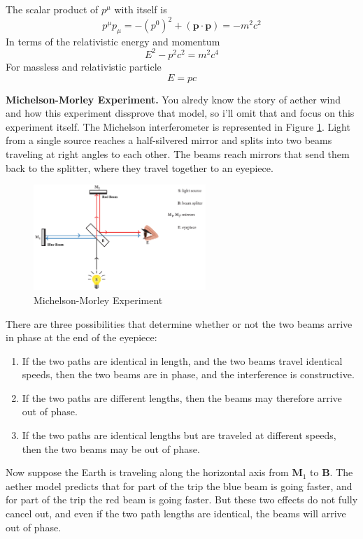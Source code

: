 \documentclass[../main.tex]{subfiles}
\begin{document}
The scalar product of $p^\mu$ with itself is
\begin{equation*}
    p^\mu p_\mu=-(p^0)^2+(\mathbf{p}\cdot\mathbf{p})=-m^2c^2
\end{equation*}
In terms of the relativistic energy and momentum
\begin{equation*}
    E^2-p^2c^2=m^2c^4
\end{equation*}
For massless and relativistic particle
\begin{equation*}
    E=pc
\end{equation*}

\textbf{Michelson-Morley Experiment.} You alredy know the story of aether wind and how this experiment dissprove that model, so i'll omit that and focus on this experiment itself. The Michelson interferometer is represented in Figure \ref{fig:MMExperiment1}. Light from a single source reaches a half-silvered mirror and splits into two beams traveling at right angles to each other. The beams reach mirrors that send them back to the splitter, where they travel together to an eyepiece.
\begin{figure}
    \centering
    \includegraphics[height=4cm]{../Rss/Relativity/MichelsonMorley.png}
    \caption{Michelson-Morley Experiment}
    \label{fig:MMExperiment1}
\end{figure}
There are three possibilities that determine whether or not the two beams arrive in phase at the end of the eyepiece:
\begin{enumerate}
    \item If the two paths are identical in length, and the two beams travel identical speeds, then
    the two beams are in phase, and the interference is constructive.
    \item If the two paths are different lengths, then the beams may therefore arrive out of phase.
    \item If the two paths are identical lengths but are traveled at different speeds, then the two beams may be out of phase.
\end{enumerate}
Now suppose the Earth is traveling along the horizontal axis from $\mathbf{M}_1$ to \textbf{B}. The aether model predicts that for part of the trip the blue beam is going faster, and for part of the trip the red beam is going faster. But these two effects do not fully cancel out, and even if the two path lengths are identical, the beams will arrive out of phase.
\end{document}
